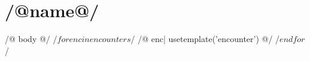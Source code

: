\chapter{/@name@/}
\label{chapter_/@label@/}

/@ body @/
\vfill
/$ for enc in encounters $/
/@ enc| usetemplate('encounter') @/
/$ endfor $/